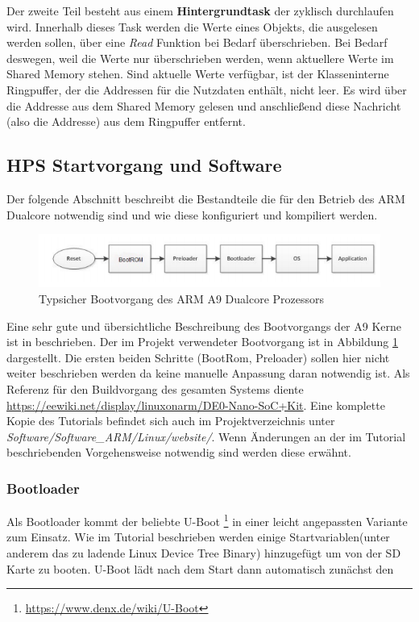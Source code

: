 Der zweite Teil besteht aus einem \textbf{Hintergrundtask} der zyklisch durchlaufen wird. Innerhalb dieses Task werden die Werte eines Objekts, die ausgelesen werden sollen, über eine \textit{Read} Funktion bei Bedarf überschrieben. Bei Bedarf deswegen, weil die Werte nur überschrieben werden, wenn aktuellere Werte im Shared Memory stehen. Sind aktuelle Werte verfügbar, ist der Klasseninterne Ringpuffer, der die Addressen für die Nutzdaten enthält, nicht leer. Es wird über die Addresse aus dem Shared Memory gelesen und anschließend diese Nachricht (also die Addresse) aus dem Ringpuffer entfernt.

\subsection{\ac{HPS} Startvorgang und Software}
Der folgende Abschnitt beschreibt die Bestandteile die für den Betrieb des ARM Dualcore notwendig sind und wie diese konfiguriert und kompiliert werden.\\

\begin{figure}
	\includegraphics[width=\textwidth]{Abb/Booting.png}
	\caption{Typsicher Bootvorgang des ARM A9 Dualcore Prozessors \cite{arm_booting}}
	\label{Software:ArmBooting}
\end{figure}

Eine sehr gute und übersichtliche Beschreibung des Bootvorgangs der A9 Kerne ist in \cite{arm_booting} beschrieben. Der im \Projectname Projekt verwendeter Bootvorgang ist in Abbildung \ref{Software:ArmBooting} dargestellt. Die ersten beiden Schritte (BootRom, Preloader) sollen hier nicht weiter beschrieben werden da keine manuelle Anpassung daran notwendig ist. Als Referenz für den Buildvorgang des gesamten Systems diente \href{https://eewiki.net/display/linuxonarm/DE0-Nano-SoC+Kit}{https://eewiki.net/display/linuxonarm/DE0-Nano-SoC+Kit}. Eine komplette Kopie des Tutorials befindet sich auch im Projektverzeichnis unter \textit{Software/Software\_ARM/Linux/website/}. Wenn Änderungen an der im Tutorial beschriebenden Vorgehensweise notwendig sind werden diese erwähnt.

\subsubsection{Bootloader}
Als Bootloader kommt der beliebte U-Boot \footnote{\href{https://www.denx.de/wiki/U-Boot}{https://www.denx.de/wiki/U-Boot}} in einer leicht angepassten Variante zum Einsatz. Wie im Tutorial beschrieben werden einige Startvariablen(unter anderem das zu ladende Linux Device Tree Binary) hinzugefügt um von der SD Karte zu booten. U-Boot lädt nach dem Start dann automatisch zunächst den

